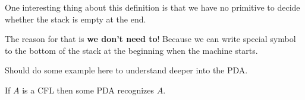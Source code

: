 One interesting thing about this definition is that we have no primitive to decide whether the stack is empty at the end.

The reason for that is \textbf{we don't need to}! Because we can write special symbol to the bottom of the stack at the beginning when the machine starts.

\begin{remark}
    Should do some example here to understand deeper into the PDA.   
\end{remark}

\begin{theorem}
    If \(A\)  is a CFL then some PDA recognizes \(A\). 
\end{theorem}
